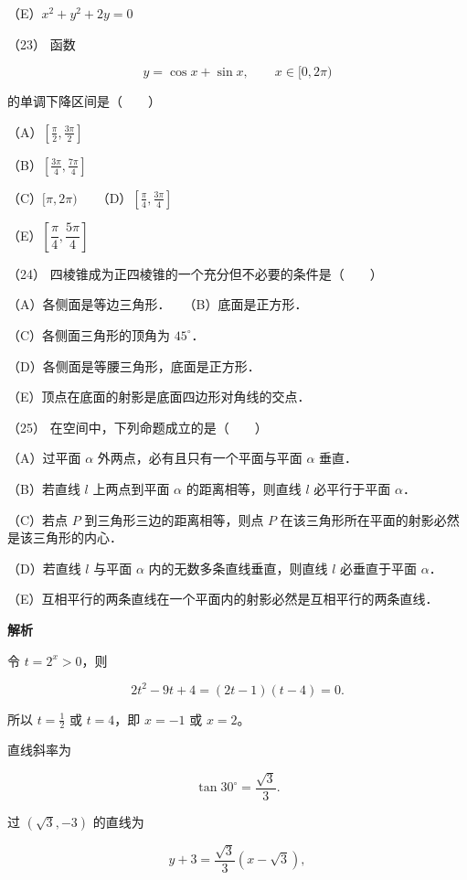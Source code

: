 \begin{answer}
（E）$x^2+y^2+2y=0$

（23） 函数

\nopagebreak[4]
\[
y=\cos x+\sin x,\qquad x\in[0,2\pi)
\]

的单调下降区间是\mbox{（　　）}

（A）$\left[\frac\pi2,\frac{3\pi}2\right]$

（B）$\left[\frac{3\pi}4,\frac{7\pi}4\right]$

（C）$[\pi,2\pi)$　　（D）$\left[\frac\pi4,\frac{3\pi}4\right]$

（E）$\left[\dfrac\pi4,\dfrac{5\pi}4\right]$

（24） 四棱锥成为正四棱锥的一个充分但不必要的条件是\mbox{（　　）}

（A）各侧面是等边三角形．　　（B）底面是正方形．

（C）各侧面三角形的顶角为 $45^\circ$．

（D）各侧面是等腰三角形，底面是正方形．

（E）顶点在底面的射影是底面四边形对角线的交点．

（25） 在空间中，下列命题成立的是\mbox{（　　）}

（A）过平面 $\alpha$ 外两点，必有且只有一个平面与平面 $\alpha$ 垂直．

（B）若直线 $l$ 上两点到平面 $\alpha$ 的距离相等，则直线 $l$ 必平行于平面 $\alpha$．

（C）若点 $P$ 到三角形三边的距离相等，则点 $P$ 在该三角形所在平面的射影必然是该三角形的内心．

（D）若直线 $l$ 与平面 $\alpha$ 内的无数多条直线垂直，则直线 $l$ 必垂直于平面 $\alpha$．

（E）互相平行的两条直线在一个平面内的射影必然是互相平行的两条直线．

\textbf{解析}


令 $t=2^x>0$，则

\nopagebreak[4]
\[
2t^2-9t+4=(2t-1)(t-4)=0.
\]

所以 $t=\frac12$ 或 $t=4$，即 $x=-1$ 或 $x=2$。


直线斜率为

\nopagebreak[4]
\[
\tan30^\circ=\frac{\sqrt3}{3}.
\]

过 $(\sqrt3,-3)$ 的直线为

\nopagebreak[4]
\[
y+3=\frac{\sqrt3}{3}(x-\sqrt3),
\]


\end{answer}
